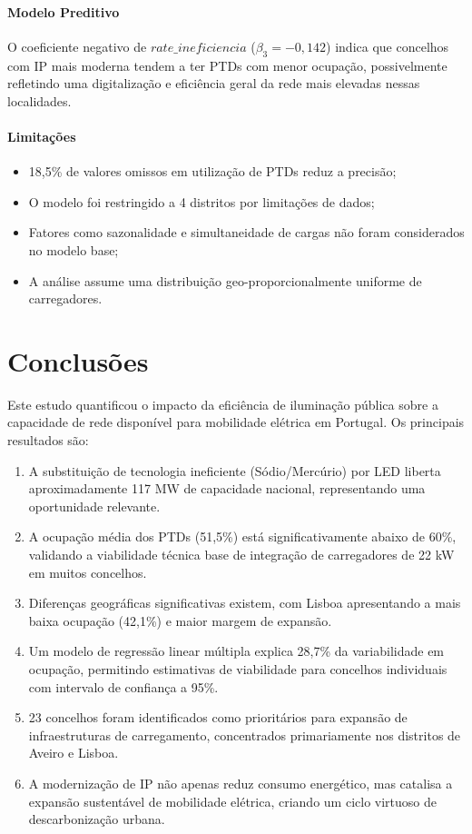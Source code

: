 \documentclass[conference]{IEEEtran}
\begin{document}
\paragraph{Modelo Preditivo}
O coeficiente negativo de $rate\_ineficiencia$ ($\beta_3 = -0,142$) indica que concelhos com IP mais moderna tendem a ter PTDs com menor ocupação, possivelmente refletindo uma digitalização e eficiência geral da rede mais elevadas nessas localidades.

\paragraph{Limitações}
\begin{itemize}
\item 18,5\% de valores omissos em utilização de PTDs reduz a precisão;
\item O modelo foi restringido a 4 distritos por limitações de dados;
\item Fatores como sazonalidade e simultaneidade de cargas não foram considerados no modelo base;
\item A análise assume uma distribuição geo-proporcionalmente uniforme de carregadores.
\end{itemize}

\section{Conclusões}

Este estudo quantificou o impacto da eficiência de iluminação pública sobre a capacidade de rede disponível para mobilidade elétrica em Portugal. Os principais resultados são:

\begin{enumerate}
\item A substituição de tecnologia ineficiente (Sódio/Mercúrio) por LED liberta aproximadamente 117 MW de capacidade nacional, representando uma oportunidade relevante.

\item A ocupação média dos PTDs (51,5\%) está significativamente abaixo de 60\%, validando a viabilidade técnica base de integração de carregadores de 22 kW em muitos concelhos.

\item Diferenças geográficas significativas existem, com Lisboa apresentando a mais baixa ocupação (42,1\%) e maior margem de expansão.

\item Um modelo de regressão linear múltipla explica 28,7\% da variabilidade em ocupação, permitindo estimativas de viabilidade para concelhos individuais com intervalo de confiança a 95\%.

\item 23 concelhos foram identificados como prioritários para expansão de infraestruturas de carregamento, concentrados primariamente nos distritos de Aveiro e Lisboa.

\item A modernização de IP não apenas reduz consumo energético, mas catalisa a expansão sustentável de mobilidade elétrica, criando um ciclo virtuoso de descarbonização urbana.
\end{enumerate}
\end{document}

